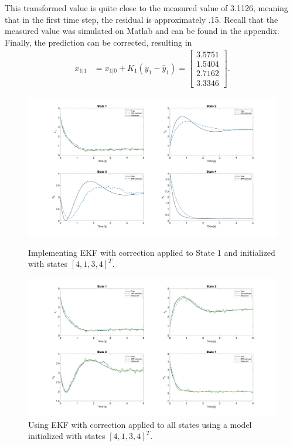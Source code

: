 \begin{enumerate}
\noindent This transformed value is quite close to the measured value of 3.1126, meaning that in the first time step, the residual is approximately .15. Recall that the measured value was simulated on Matlab and can be found in the appendix.\\

\noindent Finally, the prediction can be corrected, resulting in
\begin{align*}
 x_{1|1}&=
  x_{1|0} + K_1 (y_1 - \hat y_1) =
\begin{bmatrix}
3.5751\\
1.5404 \\
2.7162 \\
3.3346
\end{bmatrix}.
\end{align*}

\end{enumerate}


\begin{figure}[ht]
    \centering
    \includegraphics[scale = 0.3]{EKF_1state.png}
    \caption{Implementing EKF with correction applied to State 1 and initialized with states $[4, 1, 3, 4]^T$.}
    \label{fig:EKF_1state}
	\vspace*{\floatsep}%
    \includegraphics[scale = 0.3]{EKF_4state.png}
    \caption{Using EKF with correction applied to all states using a model initialized with states $[4, 1, 3, 4]^T$.}
    \label{fig:EKF_4state}
\end{figure}



